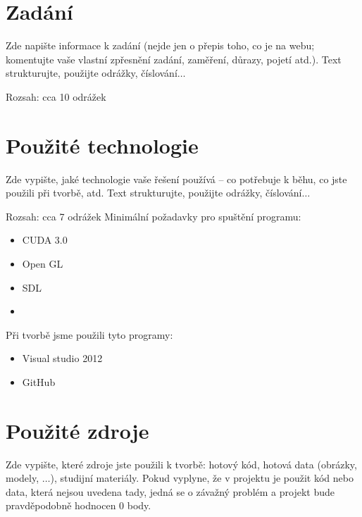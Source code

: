 \documentclass[11pt,a4paper]{article}
\begin{document}
\titlepageandcontents

\section{Zadání}

Zde napište informace k zadání (nejde jen o přepis toho, co je na webu;
komentujte vaše vlastní zpřesnění zadání, zaměření, důrazy, pojetí atd.). Text
strukturujte, použijte odrážky, číslování$\ldots$

Rozsah: cca 10 odrážek

\section{Použité technologie}

Zde vypište, jaké technologie vaše řešení používá – co potřebuje k běhu, co
jste použili při tvorbě, atd. Text strukturujte, použijte odrážky,
číslování$\ldots$

Rozsah: cca 7 odrážek
Minimální požadavky pro spuštění programu:
\begin{itemize}
\item CUDA 3.0
\item Open GL
\item SDL
\item 
\end{itemize}
Při tvorbě jsme použili tyto programy:
\begin{itemize}
\item Visual studio 2012
\item GitHub
\end{itemize}
\section{Použité zdroje}

Zde vypište, které zdroje jste použili k tvorbě: hotový kód, hotová data
(obrázky, modely, $\ldots$), studijní materiály. Pokud vyplyne, že v projektu
je použit kód nebo data, která nejsou uvedena tady, jedná se o závažný problém
a projekt bude pravděpodobně hodnocen 0 body.
\end{document}
